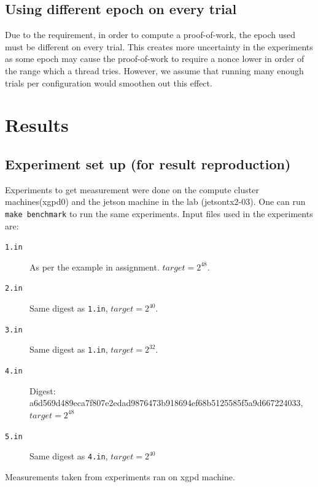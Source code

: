 \documentclass[a4paper]{article}
\begin{document}
\subsection{Using different epoch on every trial}
Due to the requirement, in order to compute a proof-of-work, the epoch used must be different on every trial. This creates more uncertainty in the experiments as some epoch may cause the proof-of-work to require a nonce lower in order of the range which a thread tries. However, we assume that running many enough trials per configuration would smoothen out this effect.

\section{Results}
\subsection{Experiment set up (for result reproduction)}
Experiments to get measurement were done on the compute cluster machines(xgpd0) and the jetson machine in the lab (jetsontx2-03). One can run \texttt{make benchmark} to run the same experiments. Input files used in the experiments are:
\begin{description}
    \item[{\texttt{1.in}}] As per the example in assignment. $target = 2^{48}$.
    \item[{\texttt{2.in}}] Same digest as \texttt{1.in}, $target = 2^{40}$.
    \item[{\texttt{3.in}}] Same digest as \texttt{1.in}, $target = 2^{32}$.
    \item[{\texttt{4.in}}] Digest: a6d569d489eca7f807e2edad9876473b918694ef68b5125585f5a9d667224033, $target = 2^{48}$
    \item[{\texttt{5.in}}] Same digest as \texttt{4.in}, $target = 2^{40}$
\end{description}


\begin{table}
    \centering
    \caption{\label{table:xgpd} Measurements taken from experiments ran on xgpd machine.}
\end{table}
\end{document}
